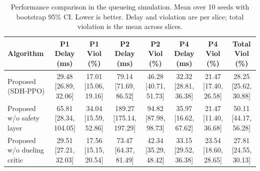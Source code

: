 \begin{table}[t]
\centering
\caption{Performance comparison in the queueing simulation. Mean over 10 seeds with bootstrap 95\% CI. Lower is better. Delay and violation are per slice; total violation is the mean across slices.}
\label{tab:3}
\begin{tabular}{lccccccc}
\toprule
Algorithm & P1 Delay (ms) & P1 Viol (\%) & P2 Delay (ms) & P2 Viol (\%) & P4 Delay (ms) & P4 Viol (\%) & Total Viol (\%) \\
\midrule
Proposed (SDH-PPO) & 29.48 [26.89, 32.06] & 17.01 [15.06, 19.16] & 79.14 [71.69, 86.52] & 46.28 [40.71, 51.73] & 32.32 [28.81, 36.38] & 21.47 [17.40, 26.58] & 28.25 [25.62, 30.88] \\
Proposed w/o safety layer & 65.81 [28.34, 104.05] & 34.04 [15.59, 52.86] & 189.27 [175.14, 197.29] & 94.82 [87.98, 98.73] & 35.97 [16.62, 67.62] & 21.47 [11.40, 36.68] & 50.11 [44.17, 56.28] \\
Proposed w/o dueling critic & 29.51 [27.21, 32.03] & 17.56 [15.15, 20.54] & 73.47 [64.37, 81.49] & 42.34 [35.29, 48.42] & 33.15 [29.52, 36.38] & 23.54 [18.60, 28.65] & 27.81 [24.55, 30.13] \\
\bottomrule
\end{tabular}
\end{table}